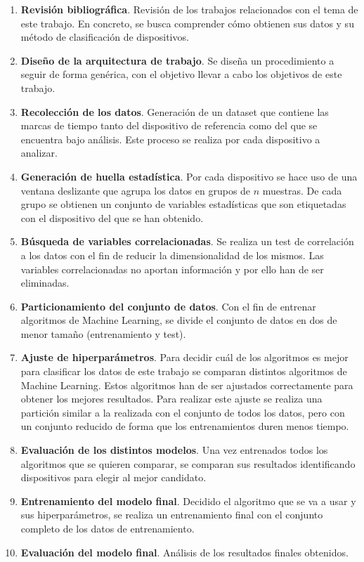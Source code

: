 \begin{enumerate}
    \item \textbf{Revisión bibliográfica}. Revisión de los trabajos relacionados con el tema de este trabajo. En concreto, se busca comprender cómo obtienen sus datos y su método de clasificación de dispositivos.
    \item \textbf{Diseño de la arquitectura de trabajo}. Se diseña un procedimiento a seguir de forma genérica, con el objetivo llevar a cabo los objetivos de este trabajo.
    \item \textbf{Recolección de los datos}. Generación de un dataset que contiene las marcas de tiempo tanto del dispositivo de referencia como del que se encuentra bajo análisis. Este proceso se realiza por cada dispositivo a analizar.
    \item \textbf{Generación de huella estadística}. Por cada dispositivo se hace uso de una ventana deslizante que agrupa los datos en grupos de $n$ muestras. De cada grupo se obtienen un conjunto de variables estadísticas que son etiquetadas con el dispositivo del que se han obtenido.
    \item \textbf{Búsqueda de variables correlacionadas}. Se realiza un test de correlación a los datos con el fin de reducir la dimensionalidad de los mismos. Las variables correlacionadas no aportan información y por ello han de ser eliminadas.
    \item \textbf{Particionamiento del conjunto de datos}. Con el fin de entrenar algoritmos de Machine Learning, se divide el conjunto de datos en dos de menor tamaño (entrenamiento y test).
    \item \textbf{Ajuste de hiperparámetros}. Para decidir cuál de los algoritmos es mejor para clasificar los datos de este trabajo se comparan distintos algoritmos de Machine Learning. Estos algoritmos han de ser ajustados correctamente para obtener los mejores resultados. Para realizar este ajuste se realiza una partición similar a la realizada con el conjunto de todos los datos, pero con un conjunto reducido de forma que los entrenamientos duren menos tiempo.
    \item \textbf{Evaluación de los distintos modelos}. Una vez entrenados todos los algoritmos que se quieren comparar, se comparan sus resultados identificando dispositivos para elegir al mejor candidato.
    \item \textbf{Entrenamiento del modelo final}. Decidido el algoritmo que se va a usar y sus hiperparámetros, se realiza un entrenamiento final con el conjunto completo de los datos de entrenamiento.
    \item \textbf{Evaluación del modelo final}. Análisis de los resultados finales obtenidos.
\end{enumerate}
